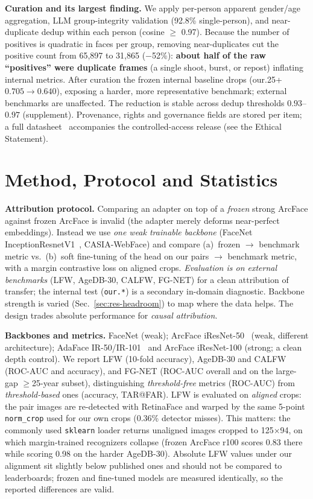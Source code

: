 \documentclass[letterpaper]{article} %
\begin{document}
\textbf{Curation and its largest finding.} We apply per-person apparent gender/age aggregation, LLM group-integrity validation (92.8\% single-person), and near-duplicate dedup within each person (cosine $\geq$ 0.97). Because the number of positives is quadratic in faces per group, removing near-duplicates cut the positive count from 65{,}897 to 31{,}865 ($-$52\%): \textbf{about half of the raw ``positives'' were duplicate frames} (a single shoot, burst, or repost) inflating internal metrics. After curation the frozen internal baseline drops (our.25+ $0.705\!\rightarrow\!0.640$), exposing a harder, more representative benchmark; external benchmarks are unaffected. The reduction is stable across dedup thresholds $0.93$--$0.97$ (supplement). Provenance, rights and governance fields are stored per item; a full datasheet~\cite{gebru2021datasheets} accompanies the controlled-access release (see the Ethical Statement).

\section{Method, Protocol and Statistics}\label{sec:method}
\textbf{Attribution protocol.} Comparing an adapter on top of a \emph{frozen} strong ArcFace against frozen ArcFace is invalid (the adapter merely deforms near-perfect embeddings). Instead we use \emph{one weak trainable backbone} (FaceNet InceptionResnetV1~\cite{schroff2015facenet}, CASIA-WebFace) and compare (a)~frozen $\rightarrow$ benchmark metric vs.\ (b)~soft fine-tuning of the head on our pairs $\rightarrow$ benchmark metric, with a margin contrastive loss on aligned crops. \emph{Evaluation is on external benchmarks} (LFW, AgeDB-30, CALFW, FG-NET) for a clean attribution of transfer; the internal test (\texttt{our.*}) is a secondary in-domain diagnostic. Backbone strength is varied (Sec.~\ref{sec:res-headroom}) to map where the data helps. The design trades absolute performance for \emph{causal attribution}.

\textbf{Backbones and metrics.} FaceNet (weak); ArcFace iResNet-50~\cite{deng2019arcface} (weak, different architecture); AdaFace IR-50/IR-101~\cite{kim2022adaface} and ArcFace iResNet-100 (strong; a clean depth control). We report LFW (10-fold accuracy), AgeDB-30 and CALFW (ROC-AUC and accuracy), and FG-NET (ROC-AUC overall and on the large-gap $\geq$25-year subset), distinguishing \emph{threshold-free} metrics (ROC-AUC) from \emph{threshold-based} ones (accuracy, TAR@FAR). LFW is evaluated on \emph{aligned} crops: the pair images are re-detected with RetinaFace and warped by the same 5-point \texttt{norm\_crop} used for our own crops (0.36\% detector misses). This matters: the commonly used \texttt{sklearn} loader returns unaligned images cropped to 125$\times$94, on which margin-trained recognizers collapse (frozen ArcFace r100 scores 0.83 there while scoring 0.98 on the harder AgeDB-30). Absolute LFW values under our alignment sit slightly below published ones and should not be compared to leaderboards; frozen and fine-tuned models are measured identically, so the reported differences are valid.
\end{document}

